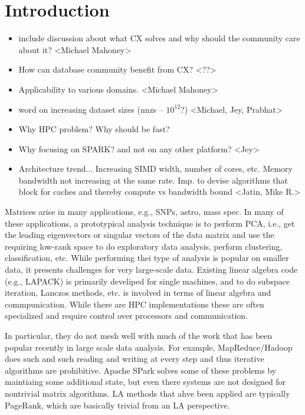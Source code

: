 \section{Introduction}
\begin{itemize}

\item include discussion about what CX solves and why should the community care about it? <Michael Mahoney>

\item How can database community benefit from CX? <??>

\item Applicability to various domains. <Michael Mahoney>

\item word on increasing dataset sizes (nnzs -- $10^{12}$?)  <Michael, Jey, Prabhat>
 \item Why HPC problem? Why should be fast?

\item Why focusing on SPARK? and not on any other platform? <Jey>

\item Architecture trend... Increasing SIMD width, number of cores, etc. Memory bandwidth not increasing at the same rate. Imp. to devise algorithms that block for caches and thereby compute vs bandwidth bound <Jatin, Mike R.>
    
\end{itemize}

Matrices arise in many applications, e.g., SNPs, astro, mass spec.
In many of these applications, a prototypical analysis technique is to perform PCA, i.e., get the leading eigenvectors or singular vectors of the data matrix and use the requiring low-rank space to do exploratory data analysis, perform clustering, classification, etc.
While performing thei type of analysis is popular on smaller data, it presents challenges for very large-scale data.  
Existing linear algebra code (e.g., LAPACK) is primarily develiped for single machines, and to do subspace iteration, Lanczos methods, etc. is involved in terms of linear algebra and commpunication.  
While there are HPC implementations these are often specialized and require control over processors and communication.

In particular, they do not mesh well with much of the work that has been popular recently in large scale data analysis.
For example, MapReduce/Hadoop does such and such reading and writing at every step and thus iterative algorithms are prohibitive. 
Apache SPark solves some of these problems by maintiaing some additional state, but even there systems are not designed for nontrivial matrix algorithms.
LA methods that ahve been applied are typically PageRank, which are basically trivial from an LA perspective.

